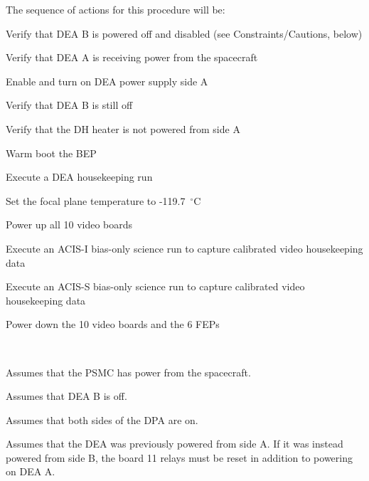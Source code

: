 \documentclass[11pt]{article}
\begin{document}
\vspace{0.25in}
\noindent The sequence of actions for this procedure will be:
\be
\item Verify that DEA B is powered off and disabled (see Constraints/Cautions, below)
\vspace{-0.10in}
\item Verify that DEA A is receiving power from the spacecraft
\vspace{-0.10in}
\item Enable and turn on DEA power supply side A
\vspace{-0.10in}
\item Verify that DEA B is still off
\vspace{-0.10in}
\item Verify that the DH heater is not powered from side A
\vspace{-0.10in}
\item Warm boot the BEP
\vspace{-0.10in}
\item Execute a DEA housekeeping run
\vspace{-0.10in}
\item Set the focal plane temperature to -119.7~$^\circ$C
\vspace{-0.10in}
\item Power up all 10 video boards
\vspace{-0.10in}
\item Execute an ACIS-I bias-only science run to capture calibrated video housekeeping data
\vspace{-0.10in}
\item Execute an ACIS-S bias-only science run to capture calibrated video housekeeping data
\vspace{-0.10in}
\item Power down the 10 video boards and the 6 FEPs
\ee

\vspace{0.15in}
\normalsize
{} \\
\normalsize
\be
\item Assumes that the PSMC has power from the spacecraft.
\vspace{-0.10in}
\item Assumes that DEA B is off.
\vspace{-0.10in}
\item Assumes that both sides of the DPA are on.
\vspace{-0.10in}
\item Assumes that the DEA was previously powered from side A. 
If it was instead powered from side B, the board 11 relays must be reset in
addition to powering on DEA A.
\ee
\vspace{0.1in}
\normalsize
{} \\
\normalsize
\end{document}
